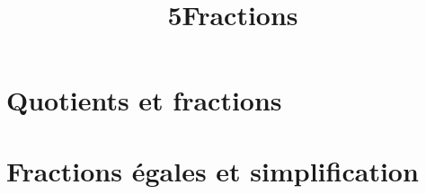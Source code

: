 \documentclass[12pt,a4paper]{article}
\date{}
\title{\textcircled{{\normalsize{5}}}Fractions}
\begin{document}
	\maketitle








\vspace{-0.5cm}

\section{Quotients et fractions}



%
%

\section{Fractions égales et simplification}


%
%
%
%

%
\end{document}

